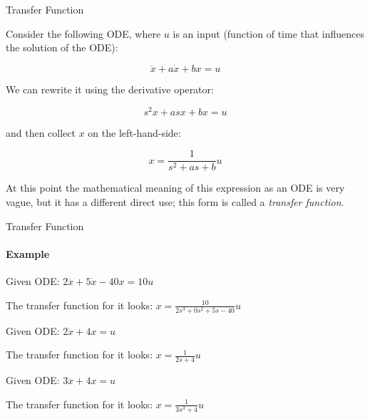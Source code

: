 \documentclass{beamer}
\begin{document}
\begin{frame}{Transfer Function}
\begin{flushleft}

Consider the following ODE, where $u$ is an input (function of time that influences the solution of the ODE):

\begin{equation}
\ddot x + a \dot x + b x = u
\end{equation}

We can rewrite it using the derivative operator:

\begin{equation}
s^2 x + a s x + b x = u
\end{equation}

and then collect $x$ on the left-hand-side:

\begin{equation}
x = \frac{1}{s^2 + a s + b} u
\end{equation}

At this point the mathematical meaning of this expression as an ODE is very vague, but it has a different direct use; this form is called a \emph{transfer function}.

\end{flushleft}
\end{frame}


\begin{frame}{Transfer Function}
\framesubtitle{Example}
\begin{flushleft}

\begin{example}
Given ODE: $2\dddot x + 5\dot x - 40 x = 10 u$

The transfer function for it looks: 
$x = \frac{10}{2 s^3 + 0 s^2 + 5 s - 40} u$
\end{example}


\begin{example}
Given ODE: $2\dot x+ 4 x = u$

The transfer function for it looks: $x = \frac{1}{2 s + 4} u$
\end{example}


\begin{example}
Given ODE: $3\dddot x + 4x = u$

The transfer function for it looks: $x = \frac{1}{3 s^3 + 4} u$
\end{example}

\end{flushleft}
\end{frame}
\end{document}
